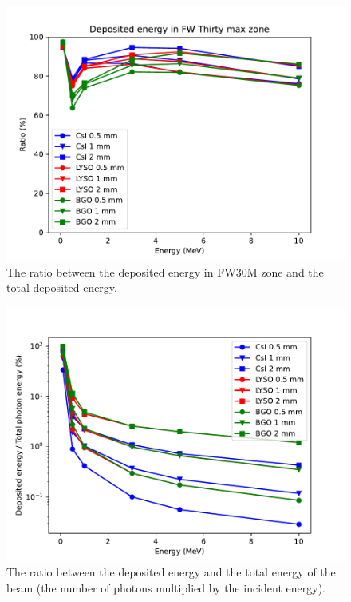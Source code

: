 \documentclass{article}
\begin{document}
\begin{figure}[H]
    \centering
    \includegraphics[width=0.8\linewidth]{images/task6/dep_Thirty.pdf}
    \caption{The ratio between the deposited energy in FW30M zone and the total deposited energy.}
\end{figure}

\begin{figure}[H]
    \centering
    \includegraphics[width=0.8\linewidth]{images/task6/edep_versus_total.pdf}
    \caption{The ratio between the deposited energy and the total energy of the beam (the number of photons multiplied by the incident energy).}
\end{figure}
\end{document}
